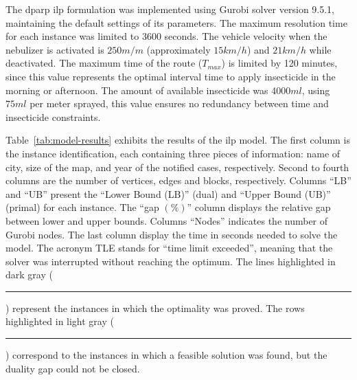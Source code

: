 \documentclass[a4paper,11pt]{article}
\newcommand\crule[3][black]{\textcolor{#1}{\rule{#2}{#3}}}
\begin{document}
The  \gls{dparp}  \gls{ilp}  formulation  was implemented  using  Gurobi  solver
version 9.5.1, maintaining  the default settings of its  parameters. The maximum
resolution  time for  each instance  was limited  to 3600  seconds. The  vehicle
velocity when  the nebulizer is  activated is $250m/m$  (approximately $15km/h$)
and $21km/h$  while deactivated. The  maximum time  of the route  ($T_{max}$) is
limited by 120 minutes, since this value represents the optimal interval time to
apply  insecticide  in  the  morning  or  afternoon.  The  amount  of  available
insecticide was 4000$ml$, using $75ml$ per  meter sprayed, this value ensures no
redundancy between time and insecticide constraints.

Table~\ref{tab:model-results} exhibits  the results of the  \gls{ilp} model. The
first column  is the  instance identification, each  containing three  pieces of
information: name  of city,  size of the  map, and year  of the  notified cases,
respectively. Second  to fourth columns  are the  number of vertices,  edges and
blocks, respectively. Columns ``LB'' and ``UB'' present the ``Lower Bound (LB)''
(dual) and ``Upper  Bound (UB)'' (primal) for each instance.  The ``gap $(\%)$''
column  displays  the relative  gap  between  lower  and upper  bounds.  Columns
``Nodes'' indicates the number of Gurobi nodes. The last column display the time
in seconds needed  to solve the model.  The acronym TLE stands  for ``time limit
exceeded'',  meaning  that  the  solver was  interrupted  without  reaching  the
optimum. The lines highlighted in dark gray (\crule[gr]{3mm}{3mm}) represent the
instances in which the optimality was proved. The rows highlighted in light gray
(\crule[lgr]{3mm}{3mm}) correspond to the instances in which a feasible solution
was found, but the duality gap could not be closed.
\end{document}

